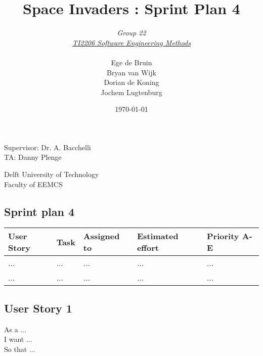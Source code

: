 \documentclass[10pt]{article}
\begin{document}
\title{Space Invaders : Sprint Plan 4}
\date{\today}
\author{\textit{Group 22}\\ \textit{\underline{TI2206 Software Engineering Methods}} \\
 \\Ege de Bruin \\ Bryan van Wijk \\ Dorian de Koning \\ Jochem Lugtenburg }
 \maketitle  
 \begin{center}
Supervisor: Dr. A. Bacchelli\\
TA: Danny Plenge\\
 \end{center}     
 \begin{center}
 Delft University of Technology\\
 Faculty of EEMCS\\
 \end{center}
 \thispagestyle{empty}
 \pagebreak
 
\begin{center}

\section*{Sprint plan 4}

    \begin{tabular}{ | p{2cm} | p{9cm} | p{2.1cm} | p{2cm} | p{2cm} |}
    \hline
    User Story & Task & Assigned to & Estimated effort & Priority A-E \\ \hline
    ... & ... & ... & ... & ...\\ 
    ... & ... & ... & ... & ...\\ \hline    
    \end{tabular}
    
\end{center}

\subsection*{User Story 1}
As a ...\\ 
\indent I want ...\\
So that ...
\end{document}
